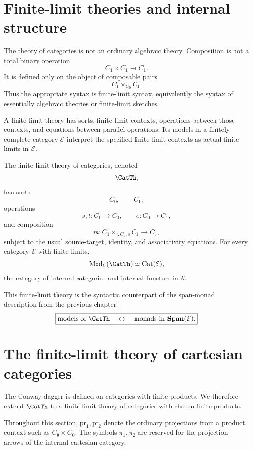 \section{Finite-limit theories and internal structure}
\label{sec:finite-limit-theories-internal-structure}

The theory of categories is not an ordinary algebraic theory.  Composition is
not a total binary operation
\[
C_1\times C_1\to C_1.
\]
It is defined only on the object of composable pairs
\[
C_1\times_{C_0}C_1.
\]
Thus the appropriate syntax is finite-limit syntax, equivalently the syntax
of essentially algebraic theories or finite-limit sketches.

A finite-limit theory has sorts, finite-limit contexts, operations between
those contexts, and equations between parallel operations.  Its models in a
finitely complete category \(\mathcal E\) interpret the specified finite-limit
contexts as actual finite limits in \(\mathcal E\).

The finite-limit theory of categories, denoted
\[
\CatTh,
\]
has sorts
\[
C_0,
\qquad
C_1,
\]
operations
\[
s,t:C_1\to C_0,
\qquad
e:C_0\to C_1,
\]
and composition
\[
m:C_1\times_{t,C_0,s}C_1\to C_1,
\]
subject to the usual source-target, identity, and associativity equations.
For every category \(\mathcal E\) with finite limits,
\[
\operatorname{Mod}_{\mathcal E}(\CatTh)
\simeq
\operatorname{Cat}(\mathcal E),
\]
the category of internal categories and internal functors in \(\mathcal E\).

This finite-limit theory is the syntactic counterpart of the span-monad
description from the previous chapter:
\[
\boxed{
\text{models of }\CatTh
\quad\leftrightarrow\quad
\text{monads in }\mathbf{Span}(\mathcal E).
}
\]

\section{The finite-limit theory of cartesian categories}
\label{sec:cartesian-categories-finite-limit-theory}

The Conway dagger is defined on categories with finite products.  We therefore
extend \(\CatTh\) to a finite-limit theory of categories with chosen finite
products.

Throughout this section, \(\mathrm{pr}_1,\mathrm{pr}_2\) denote the ordinary
projections from a product context such as \(C_0\times C_0\).  The symbols
\(\pi_1,\pi_2\) are reserved for the projection arrows of the internal
cartesian category.

